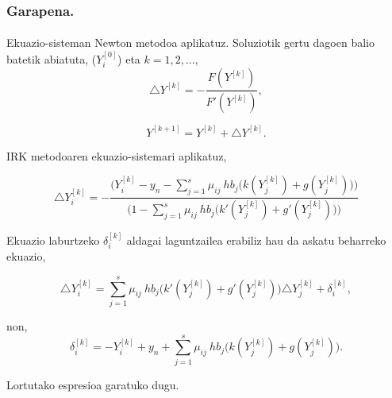 \subsubsection*{Garapena.}

\paragraph*{}Ekuazio-sisteman Newton metodoa aplikatuz. Soluziotik gertu dagoen balio batetik abiatuta, ($Y_i^{[0]}$) eta $k=1,2,\dots$, 
\begin{equation*}
\triangle Y^{[k]}=-\frac{F(Y^{[k]})}{F'(Y^{[k]})},
\end{equation*}

\begin{equation*}
Y^{[k+1]}=Y^{[k]}+\triangle Y^{[k]}.
\end{equation*}

IRK metodoaren ekuazio-sistemari aplikatuz,

\begin{equation*}
\triangle Y_i^{[k]}=-\frac{\big(Y_{i}^{[k]}-y_n- \sum\limits_{j=1}^{s} \mu_{ij} \ hb_j                               \big(k(Y_{j}^{[k]})+g(Y_{j}^{[k]})\big)\big)}
                          {\big(1-\sum\limits_{j=1}^{s} \mu_{ij} \ hb_j \big(k'(Y_{j}^{[k]})+g'(Y_{j}^{[k]})\big)\big)}
\end{equation*}

Ekuazio laburtzeko $\delta_i^{[k]}$ aldagai laguntzailea erabiliz hau da askatu beharreko ekuazio,

\begin{equation}
\triangle Y_i^{[k]}=\sum\limits_{j=1}^{s} \mu_{ij} \ hb_j \big(k'(Y_{j}^{[k]})+g'(Y_{j}^{[k]})\big)\triangle Y_j^{[k]}+\delta_i^{[k]},
\end{equation}

non,
\begin{equation*}
\delta_i^{[k]}=-Y_{i}^{[k]}+y_n+ \sum\limits_{j=1}^{s} \mu_{ij} \ hb_j \big(k(Y_{j}^{[k]})+g(Y_{j}^{[k]})\big).
\end{equation*}

Lortutako espresioa garatuko dugu.

